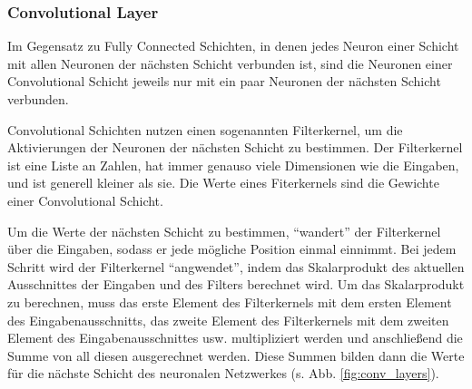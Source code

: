 \documentclass[10pt]{article}
\newcommand{\feng}[1]{{#1}}
\begin{document}

\subsubsection{Convolutional Layer}

Im Gegensatz zu Fully Connected Schichten, in denen jedes Neuron einer Schicht mit allen Neuronen der nächsten Schicht verbunden ist, sind die Neuronen einer Convolutional Schicht jeweils nur mit ein paar Neuronen der nächsten Schicht verbunden.

Convolutional Schichten nutzen einen sogenannten Filterkernel, um die Aktivierungen der Neuronen der nächsten Schicht zu bestimmen.
Der Filterkernel ist eine Liste an Zahlen, hat immer genauso viele Dimensionen wie die Eingaben, und ist generell kleiner als sie.
Die Werte eines Fiterkernels sind die Gewichte einer Convolutional Schicht.

Um die Werte der nächsten Schicht zu bestimmen, \enquote{wandert} der Filterkernel über die Eingaben, sodass er jede mögliche Position einmal einnimmt.
Bei jedem Schritt wird der Filterkernel \enquote{angwendet}, indem das Skalarprodukt des aktuellen Ausschnittes der Eingaben und des Filters berechnet wird. 
Um das Skalarprodukt zu berechnen, muss das erste Element des Filterkernels mit dem ersten Element des Eingabenausschnitts, das zweite Element des Filterkernels mit dem zweiten Element des Eingabenausschnittes usw. multipliziert werden und anschließend die Summe von all diesen ausgerechnet werden.
Diese Summen bilden dann die Werte für die nächste Schicht des neuronalen Netzwerkes (s. Abb. \ref{fig:conv_layers}).
\end{document}
